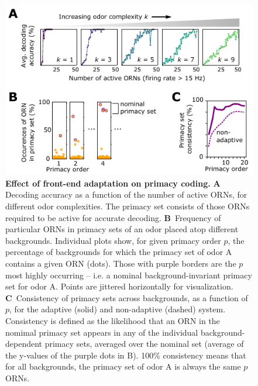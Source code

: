 \documentclass[9pt,lineno]{elife}
\begin{document}
\begin{figure}[tb]
		\includegraphics[width=0.8\linewidth]{figure4}
		\caption{\footnotesize{\textbf{Effect of front-end adaptation on primacy coding.}
				\textbf{A} Decoding accuracy as a function of the number of active ORNs, for different odor complexities. The primacy set consists of those ORNs required to be active for accurate decoding. %
				\textbf{B}~Frequency of particular ORNs in primacy sets of an odor placed atop different backgrounds. Individual plots show, for given primacy order $p$, the percentage of backgrounds for which the primacy set of odor A contains a given ORN (dots). Those with purple borders are the $p$ most highly occurring -- i.e. a nominal background-invariant primacy set for odor A. Points are jittered horizontally for visualization.
				\textbf{C}~Consistency of primacy sets across backgrounds, as a function of $p$, for the adaptive (solid) and non-adaptive (dashed) system. Consistency is defined as the likelihood that an ORN in the nomimal primacy set appears in any of the individual background-dependent primacy sets, averaged over the nominal set (average of the y-values of the purple dots in B). 100\% consistency means that for all backgrounds, the primacy set of odor A is always the same $p$ ORNs.
		}}
		\label{fig:primacy_coding}
\end{figure}
\end{document}
